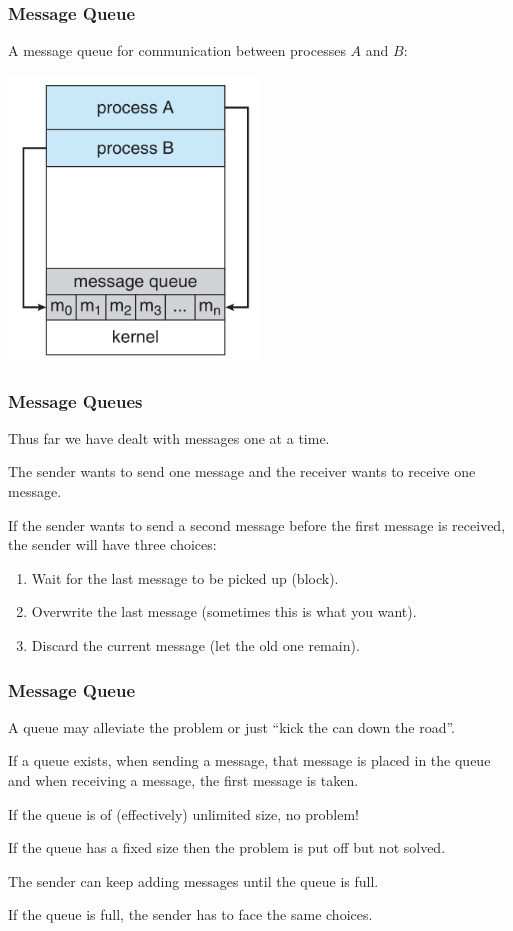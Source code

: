 \begin{frame}
\frametitle{Message Queue}
A message queue for communication between processes $A$ and $B$:
\begin{center}
	\includegraphics[width=0.5\textwidth]{images/message-passing.png}
\end{center}

\end{frame}

\begin{frame}
\frametitle{Message Queues}

Thus far we have dealt with messages one at a time.

The sender wants to send one message and the receiver wants to receive one message. 

If the sender wants to send a second message before the first message is received, the sender will have three choices:

\begin{enumerate}
	\item Wait for the last message to be picked up (block).
	\item Overwrite the last message (sometimes this is what you want).
	\item Discard the current message (let the old one remain).
\end{enumerate}


\end{frame}

\begin{frame}
\frametitle{Message Queue}

A queue may alleviate the problem or just ``kick the can down the road''.

  If a queue exists, when sending a message, that message is placed in the queue and when receiving a message, the first message is taken. 
  
 If the queue is of (effectively) unlimited size, no problem!
 
 If the queue has a fixed size then the problem is put off but not solved.
 
 The sender can keep adding messages until the queue is full. 
 
 If the queue is full, the sender has to face the same choices.

\end{frame}


